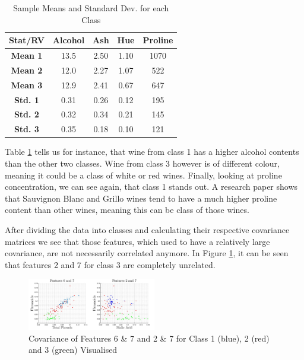 \documentclass[10pt,twocolumn,letterpaper]{article}
\begin{document}
\begin{table}
\caption{Sample Means and Standard Dev. for each Class \label{tab:statCla}}
\footnotesize
\begin{center}
\begin{tabular}{|c| c c c c|}
\hline
\bf Stat/RV & Alcohol & Ash & Hue & Proline \\ [0.5ex]
\hline
\bf Mean 1 & 13.5 & 2.50 & 1.10 & 1070 \\ [0.5ex]
\hline
\bf Mean 2 & 12.0 & 2.27 & 1.07 & 522 \\ [0.5ex]
\hline
\bf Mean 3 & 12.9 & 2.41 & 0.67 & 647 \\ [0.5ex]
\hline
\bf Std. 1 & 0.31 & 0.26 & 0.12 & 195 \\ [0.5ex]
\hline
\bf Std. 2 & 0.32 & 0.34 & 0.21 & 145 \\ [0.5ex]
\hline
\bf Std. 3 & 0.35 & 0.18 & 0.10 & 121 \\ [0.5ex]
\hline
\end{tabular}
\end{center}
\vspace{-5mm}
\end{table}

Table \ref{tab:statCla} tells us for instance, that wine from class 1 has a higher alcohol contents than the other two classes. Wine from class 3 however is of different colour, meaning it could be a class of white or red wines. Finally, looking at proline concentration, we can see again, that class 1 stands out. A research paper \cite{wine} shows that Sauvignon Blanc and Grillo wines tend to have a much higher proline content than other wines, meaning this can be class of those wines.

 
After dividing the data into classes and calculating their respective covariance matrices we see that those features, which used to have a relatively large covariance, are not necessarily correlated anymore. In Figure \ref{fig:covIdv}, it can be seen that features 2 and 7 for class 3 are completely unrelated.

\begin{figure}[H]
\centering
\includegraphics[width=0.5\textwidth]{../results/Q1_covIdv}
\caption{Covariance of Features 6 \& 7 and 2 \& 7  for Class 1 (blue), 2 (red) and 3 (green) Visualised \label{fig:covIdv}}
\end{figure}
\end{document}
